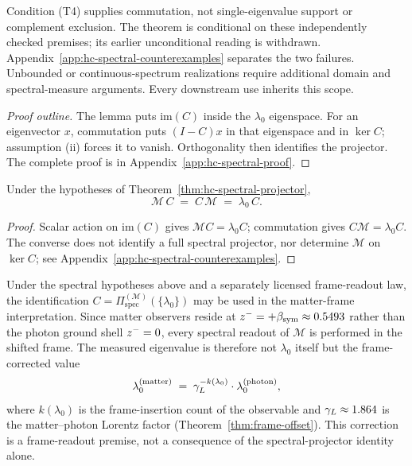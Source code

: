 \begin{remark}
\label{rem:hc-spectral-projector-conditional}
Condition (T4) supplies commutation, not single-eigenvalue support or
complement exclusion. The theorem is conditional on these independently
checked premises; its earlier unconditional reading is withdrawn.
Appendix~\ref{app:hc-spectral-counterexamples} separates the two failures.
Unbounded or continuous-spectrum realizations require additional domain
and spectral-measure arguments. Every downstream use inherits this scope.
\end{remark}

\begin{proof}[Proof outline]
The lemma puts $\mathrm{im}(C)$ inside the $\lambda_0$ eigenspace.
For an eigenvector $x$, commutation puts $(I-C)x$ in that eigenspace
and in $\ker C$; assumption (ii) forces it to vanish. Orthogonality
then identifies the projector. The complete proof is in
Appendix~\ref{app:hc-spectral-proof}.
\end{proof}

\begin{corollary}
\label{cor:M-HC-fixpoint}
Under the hypotheses of Theorem~\ref{thm:hc-spectral-projector},
\[
  \mathcal{M}\,C \;=\; C\,\mathcal{M} \;=\; \lambda_0\,C.
\]
\end{corollary}

\begin{proof}
Scalar action on $\mathrm{im}(C)$ gives $\mathcal MC=\lambda_0 C$;
commutation gives $C\mathcal M=\lambda_0 C$. The converse does not
identify a full spectral projector, nor determine $\mathcal M$ on
$\ker C$; see Appendix~\ref{app:hc-spectral-counterexamples}.
\end{proof}

\begin{remark}
\label{rem:frame-shift-spectral}
Under the spectral hypotheses above and a separately licensed
frame-readout law, the identification
$C=\Pi^{(\mathcal M)}_{\mathrm{spec}}(\{\lambda_0\})$ may be used
in the matter-frame interpretation. Since matter observers reside at
$z^- = +\beta_{\mathrm{sym}} \approx 0.5493$ rather than the photon ground shell
$z^- = 0$, every spectral readout of $\mathcal{M}$ is performed in the
shifted frame. The measured eigenvalue is therefore not $\lambda_0$ itself
but the frame-corrected value
\[
  \lambda_0^{(\mathrm{matter})}
  \;=\; \gamma_L^{-k(\lambda_0)}\cdot\lambda_0^{(\mathrm{photon})},
\]
where $k(\lambda_0)$ is the frame-insertion count of the observable and
$\gamma_L \approx 1.864$ is the matter--photon Lorentz factor
(Theorem~\ref{thm:frame-offset}). This correction is a frame-readout
premise, not a consequence of the spectral-projector identity alone.
\end{remark}

